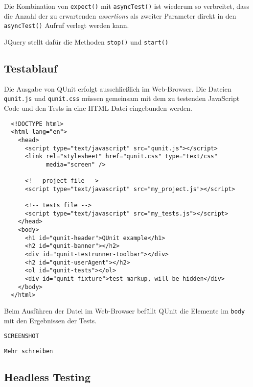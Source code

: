 \documentclass[11pt, a4paper]{article}
\begin{document}
Die Kombination von \texttt{expect()} mit \texttt{asyncTest()} ist wiederum so
verbreitet, dass die Anzahl der zu erwartenden \emph{assertions} als zweiter
Parameter direkt in den \texttt{asyncTest()} Aufruf verlegt werden kann.

JQuery stellt dafür die Methoden \texttt{stop()} und \texttt{start()}

\subsection{Testablauf}

Die Ausgabe von QUnit erfolgt ausschließlich im Web-Browser. Die Dateien
\texttt{qunit.js} und \texttt{qunit.css} müssen gemeinsam mit dem zu testenden
JavaScript Code und den Tests in eine HTML-Datei eingebunden werden.

\begin{verbatim}
  <!DOCTYPE html>
  <html lang="en">
    <head>
      <script type="text/javascript" src="qunit.js"></script>
      <link rel="stylesheet" href="qunit.css" type="text/css"
            media="screen" />

      <!-- project file -->
      <script type="text/javascript" src="my_project.js"></script>

      <!-- tests file -->
      <script type="text/javascript" src="my_tests.js"></script>
    </head>
    <body>
      <h1 id="qunit-header">QUnit example</h1>
      <h2 id="qunit-banner"></h2>
      <div id="qunit-testrunner-toolbar"></div>
      <h2 id="qunit-userAgent"></h2>
      <ol id="qunit-tests"></ol>
      <div id="qunit-fixture">test markup, will be hidden</div>
    </body>
  </html>
\end{verbatim}

Beim Ausführen der Datei im Web-Browser befüllt QUnit die Elemente im
\texttt{body} mit den Ergebnissen der Tests.

\begin{verbatim}
SCREENSHOT
\end{verbatim}

\begin{verbatim}
Mehr schreiben
\end{verbatim}

\subsection{Headless Testing}
\end{document}

